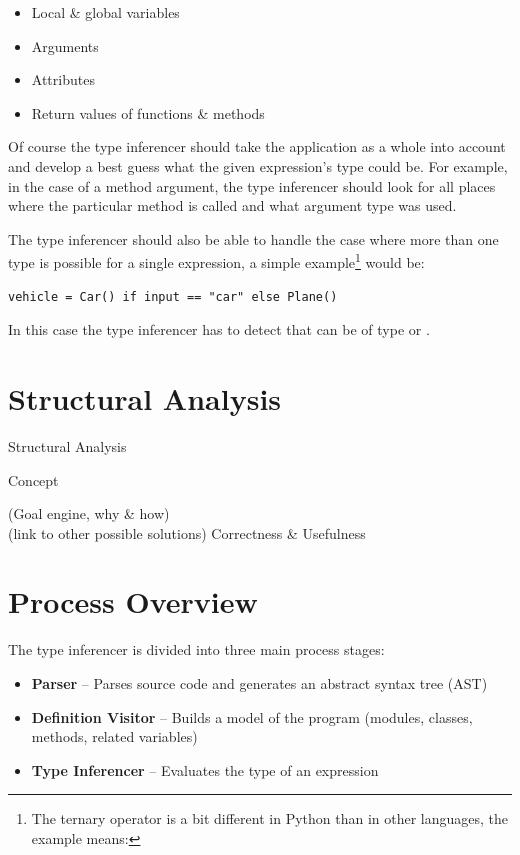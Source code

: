 \documentclass[12pt,halfparskip,DIV11,BCOR10mm]{scrreprt}
\begin{document}
\begin{itemize}
    \item Local \& global variables
    \item Arguments
    \item Attributes
    \item Return values of functions \& methods
\end{itemize}

Of course the type inferencer should take the application as a whole into account and develop a best guess what the given expression's type could be. For example, in the case of a method argument, the type inferencer should look for all places where the particular method is called and what argument type was used.

The type inferencer should also be able to handle the case where more than one type is possible for a single expression, a simple example\footnote{The ternary operator is a bit different in Python than in other languages, the example means: } would be:

\begin{lstlisting}
vehicle = Car() if input == "car" else Plane()
\end{lstlisting}

In this case the type inferencer has to detect that  can be of type  or .

\section{Structural Analysis}

Structural Analysis

{Concept}

(Goal engine, why \& how) \\
(link to other possible solutions)
Correctness \& Usefulness


\section{Process Overview}

The type inferencer is divided into three main process stages:

\begin{itemize}
    \item \textbf{Parser} – Parses source code and generates an abstract syntax tree (AST)
    \item \textbf{Definition Visitor} – Builds a model of the program (modules, classes, methods, related variables)
    \item \textbf{Type Inferencer} – Evaluates the type of an expression
\end{itemize}
\end{document}
